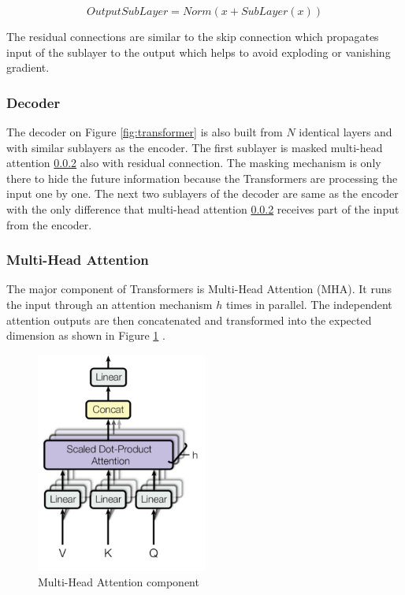             \begin{equation}
                OutputSubLayer = Norm(x + SubLayer(x))
            \end{equation}
            
            The residual connections are similar to the skip connection which propagates input of the sublayer to the output which helps to avoid exploding or vanishing gradient.
            
            \subsubsection{Decoder}
            The decoder on Figure \ref{fig:transformer} is also built from $N$ identical layers and with similar sublayers as the encoder. The first sublayer is masked multi-head attention \ref{multi-head-attention} also with residual connection. The masking mechanism is only there to hide the future information because the Transformers are processing the input one by one. The next two sublayers of the decoder are same as the encoder with the only difference that multi-head attention \ref{multi-head-attention} receives part of the input from the encoder.
            
            \subsubsection{Multi-Head Attention}\label{multi-head-attention}
            The major component of Transformers is Multi-Head Attention (MHA). It runs the input through an attention mechanism $h$ times in parallel. The independent attention outputs are then concatenated and transformed into the expected dimension as shown in Figure \ref{fig:multi-head-attention} \cite{attention-weng}.
            
            \begin{figure}[ht]
                \centering
                \includegraphics[width=0.5\textwidth]{resources/theoretical-background/multi-head-attention.png}
                \caption{Multi-Head Attention component \cite{attention-weng}}
                \label{fig:multi-head-attention}
            \end{figure}
            
